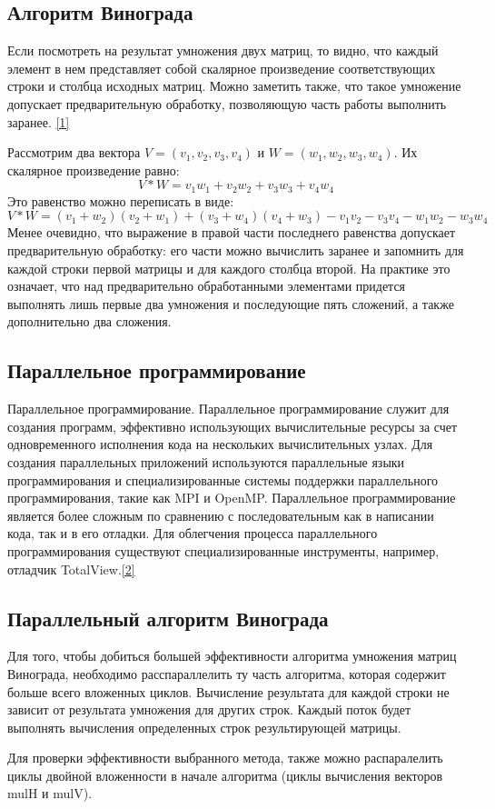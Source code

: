 \documentclass[14pt, a4paper]{extarticle}
\begin{document}
\subsection{Алгоритм Винограда}
Если посмотреть на результат умножения двух матриц, то видно, что каждый элемент в нем представляет собой скалярное произведение соответствующих строки и столбца исходных матриц. Можно заметить также, что такое умножение допускает предварительную обработку, позволяющую часть работы выполнить заранее. \hyperref[literature]{[1]}\par
Рассмотрим два вектора $V = (v_{1},v_{2},v_{3},v_{4})$ и $W = (w_{1},w_{2},w_{3},w_{4})$. Их скалярное произведение равно:
\begin{equation}
	V * W = v_{1}w_{1} + v_{2}w_{2} + v_{3}w_{3} + v_{4}w_{4}
\end{equation}
Это равенство можно переписать в виде:
\begin{equation}
	V * W = (v_{1} + w_{2})(v_{2} + w_{1}) + (v_{3} + w_{4})(v_{4} + w_{3}) -  v_{1}v_{2} - v_{3}v_{4} - w_{1}w_{2} - w_{3}w_{4}
\end{equation}
Менее очевидно, что выражение в правой части последнего равенства допускает предварительную обработку: его части можно вычислить заранее и запомнить для каждой строки первой матрицы и для каждого столбца второй. На практике это означает, что над предварительно обработанными элементами придется выполнять лишь первые два умножения и последующие пять сложений, а также дополнительно два сложения. 
\subsection{Параллельное программирование}
Параллельное программирование. Параллельное программирование служит для создания программ, эффективно использующих вычислительные ресурсы за счет одновременного исполнения кода на нескольких вычислительных узлах. Для создания параллельных приложений используются параллельные языки программирования и специализированные системы поддержки параллельного программирования, такие как MPI и OpenMP. Параллельное программирование является более сложным по сравнению с последовательным как в написании кода, так и в его отладки. Для облегчения процесса параллельного программирования существуют специализированные инструменты, например, отладчик TotalView.\hyperref[literature]{[2]}
\subsection{Параллельный алгоритм Винограда}
Для того, чтобы добиться большей эффективности алгоритма умножения матриц Винограда, необходимо расспараллелить ту часть алгоритма, которая содержит больше всего вложенных циклов. Вычисление результата для каждой строки не зависит от результата умножения для других строк. Каждый поток будет выполнять вычисления определенных строк результирующей матрицы.\par
Для проверки эффективности выбранного метода, также можно распаралелить циклы двойной вложенности в начале алгоритма (циклы вычисления векторов mulH и mulV).
\end{document}
